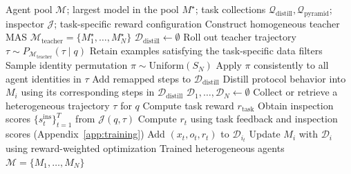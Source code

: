 \begingroup
\makeatletter
\let\appendixOriginalRuled\fs@ruled
\renewcommand{\fs@ruled}{%
  \appendixOriginalRuled
  \def\@fs@capt##1##2{%
    \begingroup
    \setlength{\fboxsep}{2pt}%
    \noindent\colorbox{appendixHeader}{%
      \parbox{\dimexpr\linewidth-2\fboxsep\relax}{%
        \color{appendixInk}\floatc@ruled{##1}{##2}}}\par
    \endgroup
  }%
  \def\@fs@pre{{\color{appendixRule}\hrule height.8pt depth0pt}\kern2pt}%
  \def\@fs@mid{\kern2pt{\color{appendixRule}\hrule}\kern2pt}%
  \def\@fs@post{\kern2pt{\color{appendixRule}\hrule}}%
}
\makeatother
\begin{algorithm}[H]
\caption{Protocol Distillation and Pyramid Supervision for Heterogeneous Collaboration}
\label{alg:collaboration}
\small
\begin{algorithmic}[1]
\Require Agent pool $\mathcal{M}$; largest model in the pool $M^\star$; task collections $\mathcal{Q}_{\mathrm{distill}},\mathcal{Q}_{\mathrm{pyramid}}$; inspector $\mathcal{J}$; task-specific reward configuration
\State Construct homogeneous teacher MAS $\mathcal{M}_{\mathrm{teacher}}=\{M_1^\star,\ldots,M_N^\star\}$
\State {}
\State $\mathcal{D}_{\mathrm{distill}}\gets\emptyset$
  \State Roll out teacher trajectory $\tau\sim P_{\mathcal{M}_{\mathrm{teacher}}}(\tau\mid q)$
  \State Retain examples satisfying the task-specific data filters
  \State Sample identity permutation $\pi\sim\mathrm{Uniform}(S_N)$
  \State Apply $\pi$ consistently to all agent identities in $\tau$
  \State Add remapped steps to $\mathcal{D}_{\mathrm{distill}}$
\EndFor
{}
  \State Distill protocol behavior into $M_i$ using its corresponding steps in $\mathcal{D}_{\mathrm{distill}}$
\EndFor
\State {}
  \State $\mathcal{D}_1,\ldots,\mathcal{D}_N\gets\emptyset$
    \State Collect or retrieve a heterogeneous trajectory $\tau$ for $q$
    \State Compute task reward $r_{\mathrm{task}}$
    \State Obtain inspection scores $\{s_t^{\mathrm{ins}}\}_{t=1}^T$ from $\mathcal{J}(q,\tau)$
      \State Compute $r_t$ using task feedback and inspection scores (Appendix~\ref{app:training})
      \State Add $(x_t,o_t,r_t)$ to $\mathcal{D}_{i_t}$
    \EndFor
  \EndFor
    \State Update $M_i$ with $\mathcal{D}_i$ using reward-weighted optimization
  \EndFor
\EndFor
\State \Return Trained heterogeneous agents $\mathcal{M}=\{M_1,\ldots,M_N\}$
\end{algorithmic}
\end{algorithm}
\endgroup

